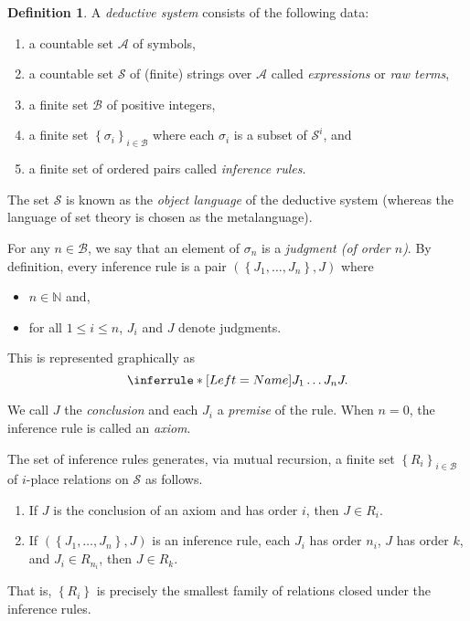 \documentclass[10pt,letterpaper,cm]{nupset}
\theoremstyle{definition}
\newtheorem{definition}{Definition}[subsection]
\theoremstyle{theorem}
\theoremstyle{remark}
\newcommand{\0}{\mathbf{0}}
\newcommand{\1}{\mathbf{1}}
\newcommand{\2}{\mathbf{2}}
\newcommand{\N}{\mathbb N}
\newcommand{\bi}{\begin{itemize}}
\newcommand{\ei}{\end{itemize}}
\newcommand{\be}{\begin{enumerate}}
\newcommand{\ee}{\end{enumerate}}
\begin{document}
\begin{definition}
A \textit{deductive system} consists  of the following data:
\be[label=(\alph*)]
\item a  countable set $\mathcal{A}$ of symbols,
\item a countable set $\mathcal{S}$ of (finite) strings over $\mathcal{A}$  called \textit{expressions} or \textit{raw terms},
\item a finite set $\mathcal{B}$ of positive integers,
\item a finite set $ \left\{\sigma_i\right\}_{i\in \mathcal{B}}$ where each $\sigma_i$ is a subset of $\mathcal{S}^i$, and
\item a finite set of ordered pairs called \textit{inference rules}.
\ee
The set $\mathcal{S}$ is known as the \textit{object language} of the deductive system (whereas the language of set theory is chosen as the metalanguage).
\end{definition}
\smallskip
For any $n\in \mathcal{B}$, we say that an element of $\sigma_n$ is a \textit{judgment (of order $n$)}.
By definition, every inference rule is a pair $\left(\left\{J_1, \ldots, J_n\right\}, J\right)$ where 
\bi
\item $n\in \N$ and, 
\item for all $1\leq i \leq n$, $J_i$ and $J$ denote judgments.
\ei  This is represented graphically as
\[
\inferrule*[Left = Name]{J_1 \\ \ldots \\ J_n}{J}.
\]

\smallskip

We call $J$ the \textit{conclusion} and each $J_i$ a \textit{premise} of the rule. 
When $n=0$, the inference rule is called an \textit{axiom}. 

\medskip

The set of inference rules generates, via mutual recursion, a finite set $\left\{R_i\right\}_{i\in \mathcal{B}}$ of $i$-place relations on $\mathcal{S}$ as follows.

\be
\item If $J$ is the conclusion of an axiom and has order $i$, then $J\in R_i$.
\item If $\left(\left\{J_1, \ldots, J_n\right\}, J\right)$ is an inference rule, each $J_i$ has order $n_i$, $J$ has order $k$, and $J_i \in R_{n_i}$, then $J \in R_k$. 
\ee  

That is, $\left\{R_i\right\}$ is precisely the smallest family of relations closed under the inference rules.
\end{document}
